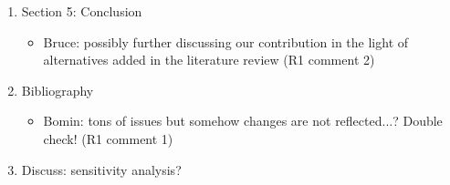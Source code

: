 \documentclass[12pt]{article}
\theoremstyle{definition}
\begin{document}
\begin{enumerate}
				\item Section 5: Conclusion
				\begin{itemize}
					\item Bruce: possibly further discussing our contribution in the light of alternatives added in the literature review (R1 comment 2)
				\end{itemize}			
					
					\item Bibliography
					\begin{itemize}
						\item Bomin: tons of issues but somehow changes are not reflected...? Double check! (R1 comment 1)
					\end{itemize}	
					
					\item Discuss: sensitivity analysis?					
\end{enumerate}
\end{document}
